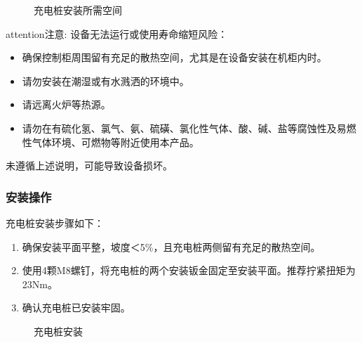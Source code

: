 \documentclass[a4paper,11pt,english,openany,oneside]{sphinxmanual}
\begin{document}
\begin{figure}[H]
\centering
\capstart

\noindent{}
\caption{充电桩安装所需空间}\label{\detokenize{_u9009_u914d_u8bbe_u5907:id39}}\end{figure}

\begin{sphinxadmonition}{attention}{注意:}
\sphinxAtStartPar
设备无法运行或使用寿命缩短风险：
\begin{itemize}
\item {} 
\sphinxAtStartPar
确保控制柜周围留有充足的散热空间，尤其是在设备安装在机柜内时。

\item {} 
\sphinxAtStartPar
请勿安装在潮湿或有水溅洒的环境中。

\item {} 
\sphinxAtStartPar
请远离火炉等热源。

\item {} 
\sphinxAtStartPar
请勿在有硫化氢、氯气、氨、硫磺、氯化性气体、酸、碱、盐等腐蚀性及易燃性气体环境、可燃物等附近使用本产品。

\end{itemize}

\sphinxAtStartPar
未遵循上述说明，可能导致设备损坏。
\end{sphinxadmonition}


\subsubsection{安装操作}
\label{\detokenize{_u9009_u914d_u8bbe_u5907:id26}}\label{\detokenize{_u9009_u914d_u8bbe_u5907:id27}}
\sphinxAtStartPar
充电桩安装步骤如下：
\begin{enumerate}
%
\item {} 
\sphinxAtStartPar
确保安装平面平整，坡度＜5\%，且充电桩两侧留有充足的散热空间。

\item {} 
\sphinxAtStartPar
使用4颗M8螺钉，将充电桩的两个安装钣金固定至安装平面。推荐拧紧扭矩为23Nm。

\item {} 
\sphinxAtStartPar
确认充电桩已安装牢固。

\end{enumerate}

\begin{figure}[H]
\centering
\capstart

\noindent{}
\caption{充电桩安装}\label{\detokenize{_u9009_u914d_u8bbe_u5907:id40}}\end{figure}
\end{document}
